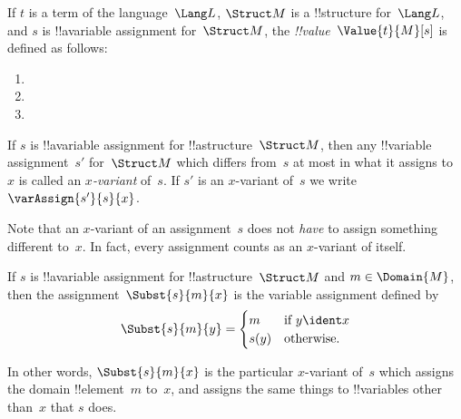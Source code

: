 \documentclass[../../../include/open-logic-section]{subfiles}
\begin{document}
\begin{defn}
If $t$ is a term of the language~$\Lang L$, $\Struct M$ is a
!!{structure} for~$\Lang L$, and $s$ is !!a{variable} assignment
for~$\Struct M$, the \emph{!!{value}}~$\Value{t}{M}[s]$ is defined as
follows:
\begin{enumerate}
\item {}
\item {}
\item {}
\end{enumerate}
\end{defn}

\begin{defn}[$x$-Variant]
If $s$ is !!a{variable} assignment for !!a{structure}~$\Struct M$, then any
!!{variable} assignment~$s'$ for~$\Struct M$ which differs from~$s$ at most
in what it assigns to~$x$ is called an \emph{$x$-variant} of~$s$.  If
$s'$ is an $x$-variant of~$s$ we write $\varAssign{s'}{s}{x}$.
\end{defn}

\begin{explain}
Note that an $x$-variant of an assignment~$s$ does not \emph{have} to
assign something different to~$x$.  In fact, every assignment counts
as an $x$-variant of itself.
\end{explain}

\begin{defn}
  If $s$ is !!a{variable} assignment for !!a{structure}~$\Struct M$
  and $m \in \Domain{M}$, then the assignment~$\Subst{s}{m}{x}$ is the
  variable assignment defined by
  \[\Subst{s}{m}{y} = \begin{cases}
    m & \text{if } y \ident x\\
    s(y) & \text{otherwise}.
  \end{cases}\]
\end{defn}

In other words, $\Subst{s}{m}{x}$ is the particular $x$-variant of~$s$
which assigns the domain !!{element}~$m$ to~$x$, and assigns the same
things to !!{variable}s other than~$x$ that $s$ does.
\end{document}

